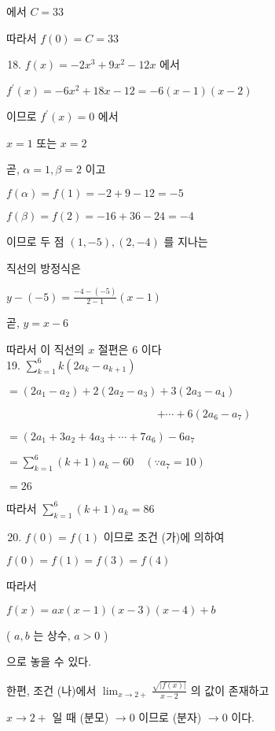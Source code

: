 \documentclass[10pt]{article}
\begin{document}
에서 \(C=33\)

따라서 \(f(0)=C=33\)

\begin{enumerate}
  \setcounter{enumi}{17}
  \item \(f(x)=-2 x^{3}+9 x^{2}-12 x\) 에서
\end{enumerate}

\(f^{\prime}(x)=-6 x^{2}+18 x-12=-6(x-1)(x-2)\)

이므로 \(f^{\prime}(x)=0\) 에서

\(x=1\) 또는 \(x=2\)

곧, \(\alpha=1, \beta=2\) 이고

\(f(\alpha)=f(1)=-2+9-12=-5\)

\(f(\beta)=f(2)=-16+36-24=-4\)

이므로 두 점 \((1,-5),(2,-4)\) 를 지나는

직선의 방정식은

\(y-(-5)=\frac{-4-(-5)}{2-1}(x-1)\)

곧, \(y=x-6\)

따라서 이 직선의 \(x\) 절편은 6 이다\\
19. \(\sum_{k=1}^{6} k\left(2 a_{k}-a_{k+1}\right)\)

\(=\left(2 a_{1}-a_{2}\right)+2\left(2 a_{2}-a_{3}\right)+3\left(2 a_{3}-a_{4}\right)\)

\[
+\cdots+6\left(2 a_{6}-a_{7}\right)
\]

\(=\left(2 a_{1}+3 a_{2}+4 a_{3}+\cdots+7 a_{6}\right)-6 a_{7}\)

\(=\sum_{k=1}^{6}(k+1) a_{k}-60 \quad\left(\because a_{7}=10\right)\)

\(=26\)

따라서 \(\sum_{k=1}^{6}(k+1) a_{k}=86\)

\begin{enumerate}
  \setcounter{enumi}{19}
  \item \(f(0)=f(1)\) 이므로 조건 (가)에 의하여
\end{enumerate}

\(f(0)=f(1)=f(3)=f(4)\)

따라서

\(f(x)=a x(x-1)(x-3)(x-4)+b\)

( \(a, b\) 는 상수, \(a>0\) )

으로 놓을 수 있다.

한편, 조건 (나)에서 \(\lim _{x \rightarrow 2+} \frac{\sqrt{|f(x)|}}{x-2}\) 의 값이 존재하고

\(x \rightarrow 2+\) 일 때 (분모) \(\rightarrow 0\) 이므로 (분자) \(\rightarrow 0\) 이다.
\end{document}
